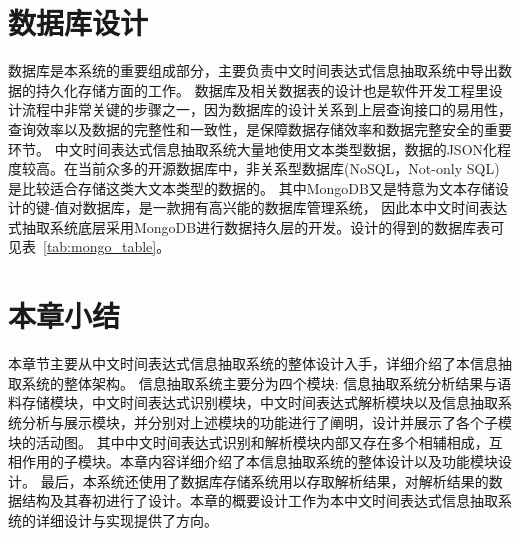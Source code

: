 \section{数据库设计}


数据库是本系统的重要组成部分，主要负责中文时间表达式信息抽取系统中导出数据的持久化存储方面的工作。
数据库及相关数据表的设计也是软件开发工程里设计流程中非常关键的步骤之一，因为数据库的设计关系到上层查询接口的易用性，查询效率以及数据的完整性和一致性，是保障数据存储效率和数据完整安全的重要环节。
中文时间表达式信息抽取系统大量地使用文本类型数据，数据的JSON化程度较高。在当前众多的开源数据库中，非关系型数据库(NoSQL，Not-only SQL)是比较适合存储这类大文本类型的数据的。
其中MongoDB又是特意为文本存储设计的键-值对数据库，是一款拥有高兴能的数据库管理系统，
因此本中文时间表达式抽取系统底层采用MongoDB进行数据持久层的开发。设计的得到的数据库表可见表~\ref{tab:mongo_table}。

\section{本章小结}

本章节主要从中文时间表达式信息抽取系统的整体设计入手，详细介绍了本信息抽取系统的整体架构。
信息抽取系统主要分为四个模块: 信息抽取系统分析结果与语料存储模块，中文时间表达式识别模块，中文时间表达式解析模块以及信息抽取系统分析与展示模块，并分别对上述模块的功能进行了阐明，设计并展示了各个子模块的活动图。
其中中文时间表达式识别和解析模块内部又存在多个相辅相成，互相作用的子模块。本章内容详细介绍了本信息抽取系统的整体设计以及功能模块设计。
最后，本系统还使用了数据库存储系统用以存取解析结果，对解析结果的数据结构及其春初进行了设计。本章的概要设计工作为本中文时间表达式信息抽取系统的详细设计与实现提供了方向。
